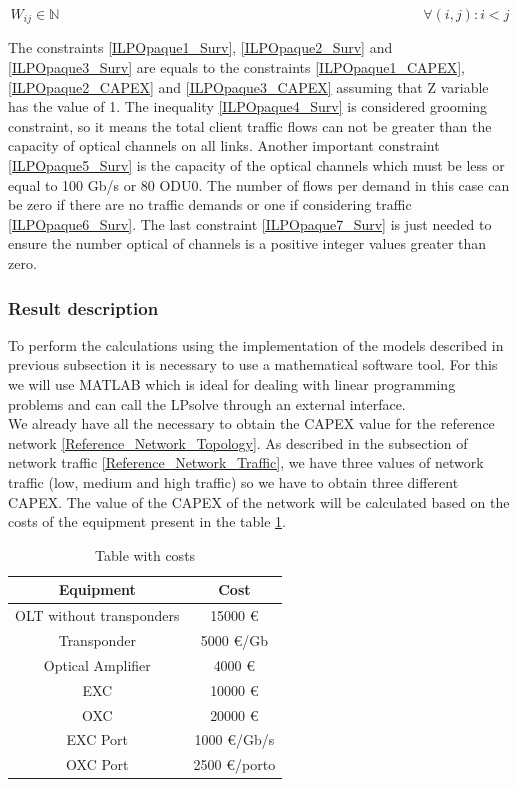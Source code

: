 \begin{equation}
W_{ij} \in \mathbb{N}  \qquad \qquad \qquad \qquad \qquad \qquad \qquad \qquad \qquad \qquad \qquad \qquad \qquad
\forall(i,j) : i < j
\label{ILPOpaque7_Surv}
\end{equation}

\vspace{10pt}

The constraints \ref{ILPOpaque1_Surv}, \ref{ILPOpaque2_Surv} and \ref{ILPOpaque3_Surv} are equals to the constraints \ref{ILPOpaque1_CAPEX}, \ref{ILPOpaque2_CAPEX} and \ref{ILPOpaque3_CAPEX} assuming that Z variable has the value of 1.
The inequality \ref{ILPOpaque4_Surv} is considered grooming constraint, so it means the total client traffic flows can not be greater than the capacity of optical channels on all links. Another important constraint \ref{ILPOpaque5_Surv} is the capacity of the optical channels which must be less or equal to 100 Gb/s or 80 ODU0. The number of flows per demand in this case can be zero if there are no traffic demands or one if considering traffic \ref{ILPOpaque6_Surv}. The last constraint \ref{ILPOpaque7_Surv} is just needed to ensure the number optical of channels is a positive integer values greater than zero.\\


\subsubsection{Result description}

To perform the calculations using the implementation of the models described in previous subsection it is necessary to use a mathematical software tool. For this we will use MATLAB which is ideal for dealing with linear programming problems and can call the LPsolve through an external interface. \\
We already have all the necessary to obtain the CAPEX value for the reference network \ref{Reference_Network_Topology}. As described in the subsection of network traffic \ref{Reference_Network_Traffic}, we have three values of network traffic (low, medium and high traffic) so we have to obtain three different CAPEX.
The value of the CAPEX of the network will be calculated based on the costs of the equipment present in the table \ref{table_cost_ilp}.

\begin{table}[h!]
\centering
\begin{tabular}{|| c | c||}
 \hline
 Equipment & Cost \\
 \hline\hline
 OLT without transponders & 15000 \euro \\
 Transponder & 5000 \euro/Gb \\
 Optical Amplifier & 4000 \euro \\
 EXC & 10000 \euro \\
 OXC & 20000 \euro \\
 EXC Port & 1000 \euro /Gb/s\\
 OXC Port & 2500 \euro /porto \\
 \hline
\end{tabular}
\caption{Table with costs}
\label{table_cost_ilp}
\end{table}


